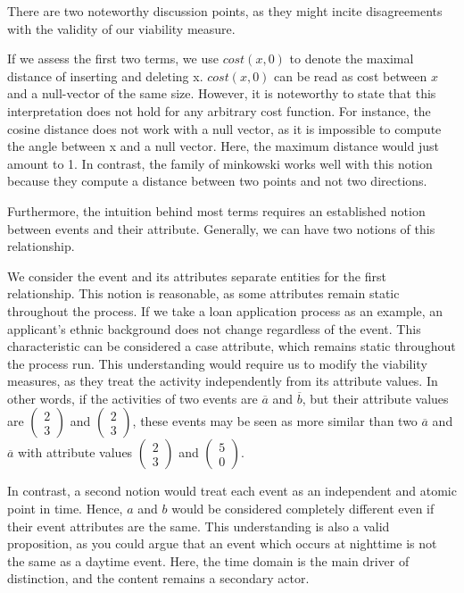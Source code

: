 \documentclass[./../../paper.tex]{subfiles}
\begin{document}
There are two noteworthy discussion points, as they might incite disagreements with the validity of our viability measure. 

If we assess the first two terms, we use $cost(x,0)$ to denote the maximal distance of inserting and deleting x. $cost(x,0)$ can be read as cost between $x$ and a null-vector of the same size. However, it is noteworthy to state that this interpretation does not hold for any arbitrary cost function. For instance, the cosine distance does not work with a null vector, as it is impossible to compute the angle between x and a null vector. Here, the maximum distance would just amount to 1. In contrast, the family of \Gls{minkowski} works well with this notion because they compute a distance between two points and not two directions. 

Furthermore, the intuition behind most terms requires an established notion between events and their attribute. Generally, we can have two notions of this relationship. 

We consider the event and its attributes separate entities for the first relationship. This notion is reasonable, as some attributes remain static throughout the process. If we take a loan application process as an example, an applicant's ethnic background does not change regardless of the event. This characteristic can be considered a case attribute, which remains static throughout the process run. This understanding would require us to modify the viability measures, as they treat the activity independently from its attribute values. In other words, if the activities of two events are $\overline{a}$ and $\overline{b}$, but their attribute values are $\left(\begin{smallmatrix}2 \\ 3\end{smallmatrix}\right)$ and $\left(\begin{smallmatrix}2 \\ 3\end{smallmatrix}\right)$, these events may be seen as more similar than two $\overline{a}$ and $\overline{a}$ with attribute values $\left(\begin{smallmatrix}2 \\ 3\end{smallmatrix}\right)$ and $\left(\begin{smallmatrix}5 \\ 0\end{smallmatrix}\right)$. 

In contrast, a second notion would treat each event as an independent and atomic point in time. Hence, $a$ and $b$ would be considered completely different even if their event attributes are the same. This understanding is also a valid proposition, as you could argue that an event which occurs at nighttime is not the same as a daytime event. Here, the time domain is the main driver of distinction, and the content remains a secondary actor. 
\end{document}
